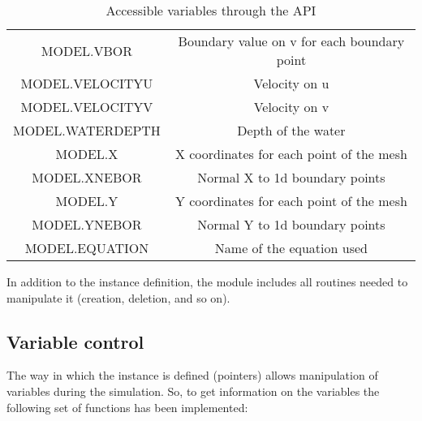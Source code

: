 \begin{table}[!h]
\begin{center}
\begin{tabular}{|cc|}
MODEL.VBOR& Boundary value on v for each boundary point\tabularnewline
MODEL.VELOCITYU& Velocity on u\tabularnewline
MODEL.VELOCITYV& Velocity on v\tabularnewline
MODEL.WATERDEPTH& Depth of the water\tabularnewline
MODEL.X& X coordinates for each point of the mesh\tabularnewline
MODEL.XNEBOR& Normal X to 1d boundary points\tabularnewline
MODEL.Y& Y coordinates for each point of the mesh\tabularnewline
MODEL.YNEBOR& Normal Y to 1d boundary points\tabularnewline
MODEL.EQUATION& Name of the equation used\tabularnewline
\hline
\end{tabular}
\caption{Accessible variables through the API\label{var_access}}
\end{center}
\end{table}

In addition to the instance definition, the module includes all routines needed
to manipulate it (creation, deletion, and so on).

\subsection{Variable control}
\label{subsec:var}
The way in which the instance is defined (pointers) allows manipulation of
variables during the simulation. So, to get information on the variables the
following set of functions has been implemented:

